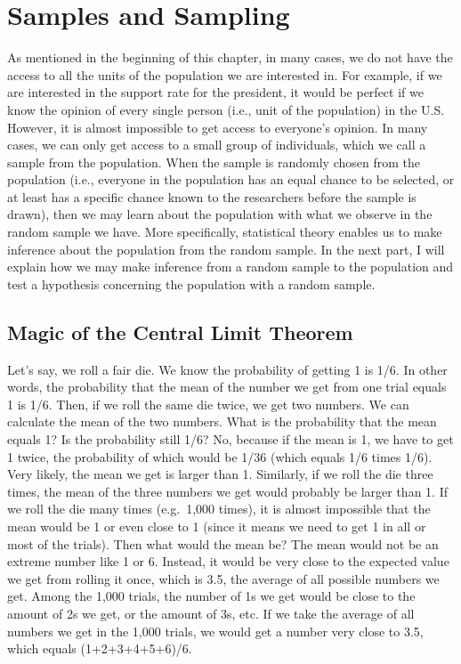 \documentclass{book}
\begin{document}
\hypertarget{samples-and-sampling-1}{%
\section{Samples and Sampling}\label{samples-and-sampling-1}}

As mentioned in the beginning of this chapter, in many cases, we do not have
the access to all the units of the population we are interested in. For
example, if we are interested in the support rate for the president, it would
be perfect if we know the opinion of every single person (i.e., unit of the
population) in the U.S. However, it is almost impossible to get access to
everyone's opinion. In many cases, we can only get access to a small group of
individuals, which we call a sample from the population. When the sample is
randomly chosen from the population (i.e., everyone in the population has an
equal chance to be selected, or at least has a specific chance known to the
researchers before the sample is drawn), then we may learn about the
population with what we observe in the random sample we have. More
specifically, statistical theory enables us to make inference about the
population from the random sample. In the next part, I will explain how we may
make inference from a random sample to the population and test a hypothesis
concerning the population with a random sample.

\hypertarget{magic-of-the-central-limit-theorem}{%
\subsection{Magic of the Central Limit
Theorem}\label{magic-of-the-central-limit-theorem}}

Let's say, we roll a fair die. We know the probability of getting 1 is 1/6. In
other words, the probability that the mean of the number we get from one trial
equals 1 is 1/6. Then, if we roll the same die twice, we get two numbers. We
can calculate the mean of the two numbers. What is the probability that the
mean equals 1? Is the probability still 1/6? No, because if the mean is 1, we
have to get 1 twice, the probability of which would be 1/36 (which equals 1/6
times 1/6). Very likely, the mean we get is larger than 1. Similarly, if we
roll the die three times, the mean of the three numbers we get would probably
be larger than 1. If we roll the die many times (e.g.~1,000 times), it is
almost impossible that the mean would be 1 or even close to 1 (since it means
we need to get 1 in all or most of the trials). Then what would the mean be?
The mean would not be an extreme number like 1 or 6. Instead, it would be very
close to the expected value we get from rolling it once, which is 3.5, the
average of all possible numbers we get. Among the 1,000 trials, the number of
1s we get would be close to the amount of 2s we get, or the amount of 3s, etc.
If we take the average of all numbers we get in the 1,000 trials, we would get
a number very close to 3.5, which equals (1+2+3+4+5+6)/6.
\end{document}
